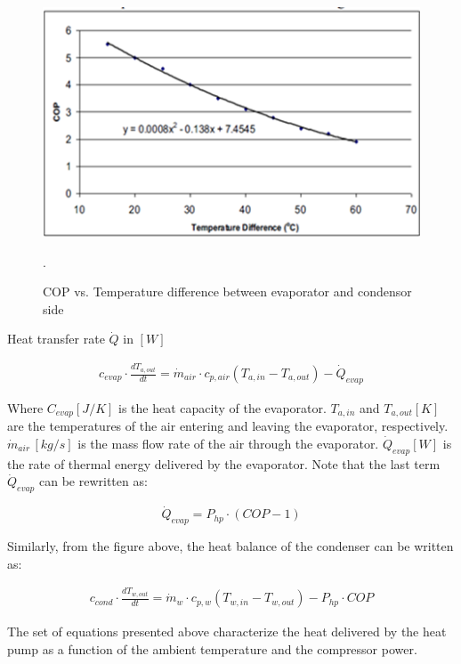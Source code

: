 \begin{figure}[H]
	\centering
	\includegraphics[width=0.8\columnwidth]{Pictures/COPvsDeltaT_Heatpump.png}
	\caption[Short title]{COP vs. Temperature difference between evaporator and condensor side \cite{GIGO}}.
	\label{fig:cop_deltaT}
\end{figure}

Heat transfer rate $\dot{Q}$ in $[W]$

\begin{eqnarray}
	c_{evap} \cdot \frac{dT_{a, out}}{dt} = \dot{m}_{air} \cdot c_{p, air} (T_{a, in} - T_{a, out}) - \dot{Q}_{evap}
\end{eqnarray}

Where $C_{evap} [J/K]$ is the heat capacity of the evaporator. $T_{a,in}$ and $T_{a, out} [K]$ are the temperatures of the air entering and leaving the evaporator, respectively. $\dot{m}_{air} \, [kg/s]$ is the mass flow rate of the air through the evaporator. $\dot{Q}_{evap} [W]$ is the rate of thermal energy delivered by the evaporator.  Note  that  the  last  term $\dot{Q}_{evap}$  can be rewritten as:

\begin{equation}
	\dot{Q}_{evap} = P_{hp} \cdot (COP -1)
\end{equation}

Similarly, from the figure above, the heat balance of the condenser can be written as:

\begin{eqnarray}
	c_{cond} \cdot \frac{dT_{w, out}}{dt} = \dot{m}_{w} \cdot c_{p, w} (T_{w, in} - T_{w, out}) - P_{hp} \cdot COP
\end{eqnarray}

The set of equations presented above characterize the heat delivered by the heat pump as a function of the ambient temperature and the compressor power.

